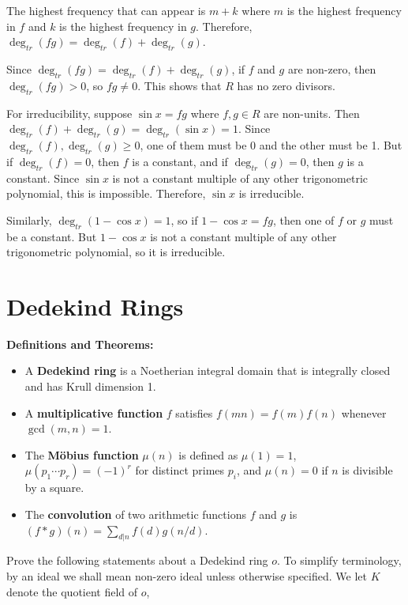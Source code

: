 The highest frequency that can appear is $m + k$ where $m$ is the highest frequency in $f$ and $k$ is the highest frequency in $g$. Therefore, $\deg_{tr}(fg) = \deg_{tr}(f) + \deg_{tr}(g)$.

Since $\deg_{tr}(fg) = \deg_{tr}(f) + \deg_{tr}(g)$, if $f$ and $g$ are non-zero, then $\deg_{tr}(fg) > 0$, so $fg \neq 0$. This shows that $R$ has no zero divisors.

For irreducibility, suppose $\sin x = fg$ where $f, g \in R$ are non-units. Then $\deg_{tr}(f) + \deg_{tr}(g) = \deg_{tr}(\sin x) = 1$. Since $\deg_{tr}(f), \deg_{tr}(g) \geq 0$, one of them must be 0 and the other must be 1. But if $\deg_{tr}(f) = 0$, then $f$ is a constant, and if $\deg_{tr}(g) = 0$, then $g$ is a constant. Since $\sin x$ is not a constant multiple of any other trigonometric polynomial, this is impossible. Therefore, $\sin x$ is irreducible.

Similarly, $\deg_{tr}(1 - \cos x) = 1$, so if $1 - \cos x = fg$, then one of $f$ or $g$ must be a constant. But $1 - \cos x$ is not a constant multiple of any other trigonometric polynomial, so it is irreducible.

\section{Dedekind Rings}

\noindent\textbf{Definitions and Theorems:}
\begin{itemize}
\item A \textbf{Dedekind ring} is a Noetherian integral domain that is integrally closed and has Krull dimension 1.
\item A \textbf{multiplicative function} $f$ satisfies $f(mn) = f(m)f(n)$ whenever $\gcd(m,n) = 1$.
\item The \textbf{M\"obius function} $\mu(n)$ is defined as $\mu(1) = 1$, $\mu(p_1 \cdots p_r) = (-1)^r$ for distinct primes $p_i$, and $\mu(n) = 0$ if $n$ is divisible by a square.
\item The \textbf{convolution} of two arithmetic functions $f$ and $g$ is $(f * g)(n) = \sum_{d|n} f(d)g(n/d)$.
\end{itemize}

Prove the following statements about a Dedekind ring $o$. To simplify terminology,
by an ideal we shall mean non-zero ideal unless otherwise specified. We let $K$
denote the quotient field of $o$,

